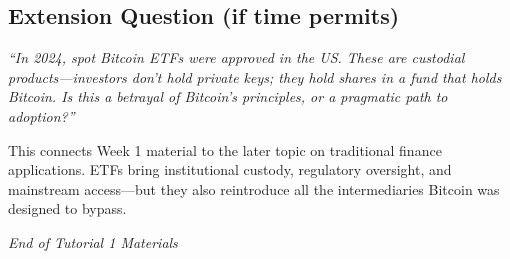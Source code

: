 \documentclass[11pt]{article}
\begin{document}
\subsection*{Extension Question (if time permits)}

\textit{``In 2024, spot Bitcoin ETFs were approved in the US. These are custodial products---investors don't hold private keys; they hold shares in a fund that holds Bitcoin. Is this a betrayal of Bitcoin's principles, or a pragmatic path to adoption?''}

\medskip
This connects Week 1 material to the later topic on traditional finance applications. ETFs bring institutional custody, regulatory oversight, and mainstream access---but they also reintroduce all the intermediaries Bitcoin was designed to bypass.

\vfill
\begin{flushright}
\textit{End of Tutorial 1 Materials}
\end{flushright}
\end{document}
